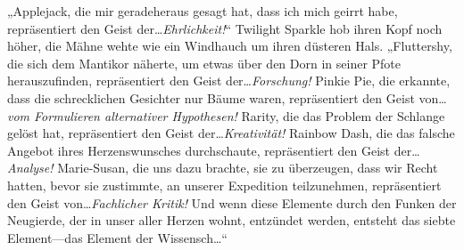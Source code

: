 „Applejack, die mir geradeheraus gesagt hat, dass ich mich geirrt habe, repräsentiert den Geist der…\emph{Ehrlichkeit!}“ Twilight Sparkle hob ihren Kopf noch höher, die Mähne wehte wie ein Windhauch um ihren düsteren Hals.
„Fluttershy, die sich dem Mantikor näherte, um etwas über den Dorn in seiner Pfote herauszufinden, repräsentiert den Geist der…\emph{Forschung!} Pinkie Pie, die erkannte, dass die schrecklichen Gesichter nur Bäume waren, repräsentiert den Geist von…\emph{vom Formulieren alternativer Hypothesen!} Rarity, die das Problem der Schlange gelöst hat, repräsentiert den Geist der…\emph{Kreativität!} Rainbow Dash, die das falsche Angebot ihres Herzenswunsches durchschaute, repräsentiert den Geist der…\emph{Analyse!} Marie-Susan, die uns dazu brachte, sie zu überzeugen, dass wir Recht hatten, bevor sie zustimmte, an unserer Expedition teilzunehmen, repräsentiert den Geist von…\emph{Fachlicher Kritik!} Und wenn diese Elemente durch den Funken der Neugierde, der in unser aller Herzen wohnt, entzündet werden, entsteht das siebte Element—das Element der Wissensch…“

